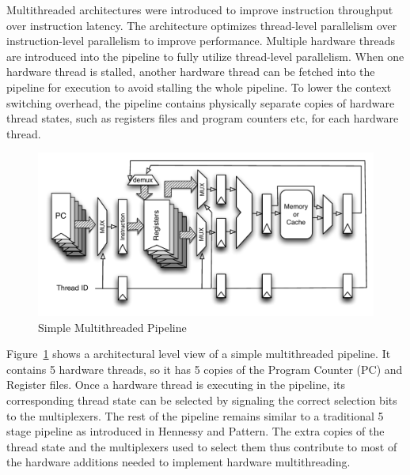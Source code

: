 Multithreaded architectures were introduced to improve instruction throughput over instruction latency.
The architecture optimizes thread-level parallelism over instruction-level parallelism to improve performance.
Multiple hardware threads are introduced into the pipeline to fully utilize thread-level parallelism. 
When one hardware thread is stalled, another hardware thread can be fetched into the pipeline for execution to avoid stalling the whole pipeline. 
To lower the context switching overhead, the pipeline contains physically separate copies of hardware thread states, such as registers files and program counters etc, for each hardware thread.
\begin{figure}
\begin{center}
\includegraphics[scale=.8]{figs/multithreaded_pipeline_block}
\end{center}
\vspace{-30pt}
\caption{Simple Multithreaded Pipeline}
\label{fig:multi-thread pipeline simplified}
\end{figure}
Figure~\ref{fig:multi-thread pipeline simplified} shows a architectural level view of a simple multithreaded pipeline.
It contains 5 hardware threads, so it has 5 copies of the Program Counter (PC) and Register files.
Once a hardware thread is executing in the pipeline, its corresponding thread state can be selected by signaling the correct selection bits to the multiplexers.
The rest of the pipeline remains similar to a traditional 5 stage pipeline as introduced in Hennessy and Pattern.   
The extra copies of the thread state and the multiplexers used to select them thus contribute to most of the hardware additions needed to implement hardware multithreading.

